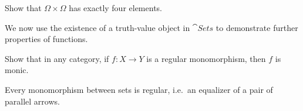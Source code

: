 \begin{exercise} Show that $\Omega\times\Omega$ has exactly four
  elements.  \end{exercise}







We now use the existence of a truth-value object in $\cat{Sets}$ to
demonstrate further properties of functions.

\begin{exercise} Show that in any category, if $f:X\to Y$ is a regular
  monomorphism, then $f$ is monic. \end{exercise}

\begin{prop} Every monomorphism between sets is regular, i.e.\ an
  equalizer of a pair of parallel
  arrows.  \label{set-regular-monic} \end{prop}

